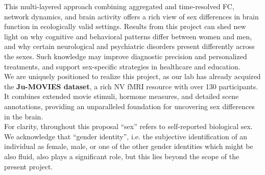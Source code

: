 \documentclass[11pt,a4paper]{article}
\begin{document}
This multi-layered approach combining aggregated and time-resolved FC, network dynamics, and brain activity offers 
a rich view of sex differences in brain function in ecologically valid settings. 
Results from this project can shed new light on why cognitive and behavioral patterns differ 
between women and men, and why certain neurological and psychiatric disorders present differently across the sexes. 
Such knowledge may improve diagnostic precision and personalized treatments, and support sex-specific 
strategies in healthcare and education.\\
We are uniquely positioned to realize this project, as our lab has already acquired the \textbf{Ju-MOVIES dataset}, 
a rich NV fMRI resource with over 130 participants. It combines extended movie stimuli, 
hormone measures, and detailed scene annotations, providing an unparalleled foundation for 
uncovering sex differences in the brain.\\
For clarity, throughout this proposal “sex” refers to self-reported biological sex. 
We acknowledge that “gender identity”, i.e. the 
subjective identification of an individual as female, male, or one of the other gender identities which might 
be also fluid, also plays a significant role, but this lies 
beyond the scope of the present project.
\end{document}

